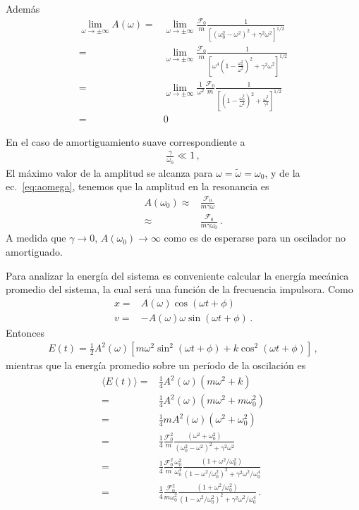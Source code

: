 \begin{frame}
Además
\begin{align}
  \lim_{\omega\to \pm\infty}A(\omega)=&
\lim_{\omega\to \pm\infty}\frac{\mathcal{F}_0}{m}\frac{1}{\left[\left(\omega_0^2-\omega^2\right)^2+\gamma^2\omega^2\right]^{1/2}}\nonumber\\
=&
\lim_{\omega\to \pm\infty}\frac{\mathcal{F}_0}{m}\frac{1}{\left[\omega^4\left(1-\frac{\omega_0^2}{\omega^2}\right)^2+\gamma^2\omega^2\right]^{1/2}}\nonumber\\
=&
\lim_{\omega\to \pm\infty}\frac{1}{\omega^2}\frac{\mathcal{F}_0}{m}\frac{1}{\left[\left(1-\frac{\omega_0^2}{\omega^2}\right)^2+\frac{\omega^2}{\gamma^2}\right]^{1/2}}\nonumber\\
=&0\,
\end{align}

En el caso de amortiguamiento suave correspondiente a
\begin{align*}
  \frac{\gamma}{\omega_0}\ll 1\,,
\end{align*}
El máximo valor de la amplitud se alcanza para $\omega=\tilde\omega=\omega_0$, y de la ec.~\eqref{eq:aomega}, tenemos que la amplitud en la resonancia es
\begin{align*}
  A(\omega_0)\approx&\frac{\mathcal{F}_0}{m\gamma\omega}\nonumber\\
\approx&\frac{\mathcal{F}_0}{m\gamma\omega_0}\,.
\end{align*}
A medida que $\gamma\to0$, $A(\omega_0)\to\infty$ como es de esperarse para un oscilador no amortiguado.


Para analizar la energía del sistema es conveniente calcular la energía mecánica promedio del sistema, la cual será una función de la frecuencia impulsora. Como
\begin{align*}
  x=& A(\omega)\cos(\omega t +\phi)\nonumber\\
  v=& -A(\omega)\omega\sin(\omega t +\phi)\,.
\end{align*}
Entonces
\begin{align*}
  E(t)=\tfrac{1}{2}A^2(\omega)\left[m\omega^2\sin^2(\omega t+\phi)+k\cos^2(\omega t +\phi)\right]\,,
\end{align*}
mientras que la energía promedio sobre un período de la oscilación es
\begin{align*}
  \langle E(t)\rangle=&\tfrac{1}{4}A^2(\omega)(m\omega^2+k)\nonumber\\
=&\tfrac{1}{4}A^2(\omega)(m\omega^2+m\omega_0^2)\nonumber\\
=&\tfrac{1}{4}m A^2(\omega)(\omega^2+\omega_0^2)\nonumber\\
=&\frac{1}{4}\frac{\mathcal{F}_0^2}{m}\frac{(\omega^2+\omega_0^2)}{\left(\omega_0^2-\omega^2\right)^2+\gamma^2\omega^2}\nonumber\\
=&\frac{1}{4}\frac{\mathcal{F}_0^2}{m}\frac{\omega_0^2}{\omega_0^4}\frac{(1+{\omega^2}/{\omega_0^2})}{\left(1-\omega^2/\omega_0^2\right)^2+\gamma^2\omega^2/\omega_0^4}\nonumber\\
=&\frac{1}{4}\frac{\mathcal{F}_0^2}{m\omega_0^2}\frac{(1+{\omega^2}/{\omega_0^2})}{\left(1-\omega^2/\omega_0^2\right)^2+\gamma^2\omega^2/\omega_0^4}\,.
\end{align*}


\end{frame}
